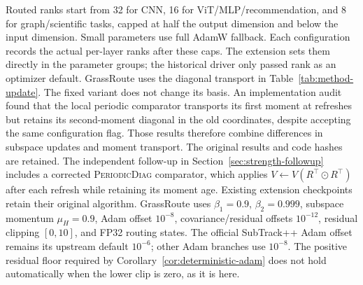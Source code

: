 Routed ranks start from 32 for CNN, 16 for ViT/MLP/recommendation, and 8 for
graph/scientific tasks, capped at half the output dimension and below the
input dimension. Small parameters use full AdamW fallback. Each configuration records the actual per-layer ranks after these caps.
The extension sets them directly in the parameter groups; the historical
driver only passed rank as an optimizer default. GrassRoute uses the diagonal transport in
Table~\ref{tab:method-update}. The fixed variant does not change its basis.
An implementation audit found that the local periodic comparator transports
its first moment at refreshes but retains its second-moment diagonal in the
old coordinates, despite accepting the same configuration flag. Those results therefore combine differences in subspace updates and moment
transport. The original results and code hashes are retained. The independent
follow-up in Section~\ref{sec:strength-followup} includes a corrected
\textsc{PeriodicDiag} comparator, which applies $V\leftarrow V(R^\top\odot
R^\top)$ after each refresh while retaining its moment age. Existing extension checkpoints retain their original algorithm.
GrassRoute uses $\beta_1=0.9$, $\beta_2=0.999$, subspace momentum
$\mu_H=0.9$, Adam offset $10^{-8}$, covariance/residual offsets
$10^{-12}$, residual clipping $[0,10]$, and FP32 routing states.
The official SubTrack++ Adam offset remains its upstream default $10^{-6}$;
other Adam branches use $10^{-8}$. The positive residual floor required by
Corollary~\ref{cor:deterministic-adam} does not hold automatically when
the lower clip is zero, as it is here.

